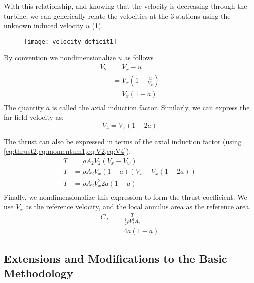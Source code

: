 With this relationship, and knowing that the velocity is decreasing through the turbine, we can generically relate the velocities at the 3 stations using the unknown induced velocity $u$ (\cref{fig:velocity-deficit}).
\begin{figure}[htbp]
\centering
\texttt{[image: velocity-deficit1]}
\caption{}
\label{fig:velocity-deficit}
\end{figure}
By convention we nondimensionalize $u$ as follows
\begin{equation}
\begin{aligned}
V_2 &= V_x - u\\
&= V_x\left(1 - \frac{u}{V_x}\right)\\
&= V_x\left(1 - a\right)\\
\end{aligned}
\label{eq:V2}
\end{equation}
The quantity $a$ is called the axial induction factor.  Similarly, we can express the far-field velocity as:
\begin{equation}
    V_4 = V_x(1 - 2a)
    \label{eq:V4}
\end{equation}

The thrust can also be expressed in terms of the axial induction factor (using \cref{eq:thrust2,eq:momentum1,eq:V2,eq:V4}):
\begin{equation}
\begin{aligned}
    T &= \rho A_2 V_2 (V_x - V_w)\\
    T &= \rho A_2 V_x(1-a) (V_x - V_x(1-2a))\\
    T &= \rho A_2 V_x^2 2a (1-a) \\
\end{aligned}
\label{eq:momT}
\end{equation}
Finally, we nondimensionalize this expression to form the thrust coefficient.  We use $V_x$ as the reference velocity, and the local annulus area as the reference area.
\begin{equation}
\begin{aligned}
    C_T &= \frac{T}{\frac{1}{2}\rho V_x^2 A_2}\\
     &= 4 a (1 - a)
    \label{eq:CTmom}
\end{aligned}
\end{equation}

\subsection{Extensions and Modifications to the Basic Methodology}


